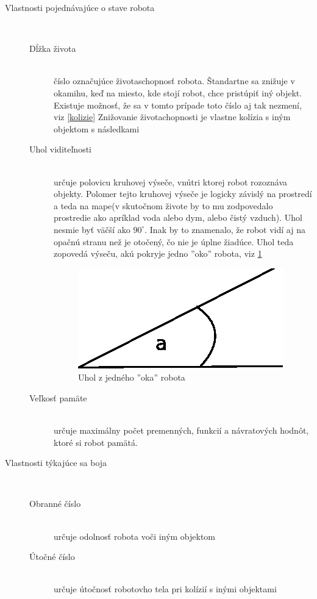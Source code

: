 \begin{description}
\item [Vlastnosti pojednávajúce o stave robota] \hfill \\
\begin{description} 
\item [Dĺžka života] \hfill \\ číslo označujúce životaschopnosť robota. Štandartne sa znižuje v okamihu, keď na miesto, kde stojí robot, chce pristúpiť iný objekt. Existuje možnosť, že sa v tomto prípade toto číslo aj tak nezmení, viz \ref{kolizie} Znižovanie životachopnosti je vlastne kolízia s iným objektom s následkami
\item [Uhol viditeľnosti]\hfill \\ určuje polovicu kruhovej výseče, vnútri ktorej robot rozoznáva objekty. Polomer tejto kruhovej výseče je logicky závislý na prostredí a teda na mape(v skutočnom živote by to mu zodpovedalo prostredie ako apríklad voda alebo dym, alebo čistý vzduch). Uhol nesmie byť väčší ako $90^\circ$. Inak by to znamenalo, že robot vidí aj na opačnú stranu než je otočený, čo nie je úplne žiadúce. Uhol teda zopovedá výseču, akú pokryje jedno ''oko'' robota, viz \ref{uhol}
\begin {figure}
\centering
\includegraphics{angle}
\caption { Uhol z jedného ''oka'' robota }
\label{uhol}
\end {figure}
\item [Veľkosť pamäte]\hfill \\ určuje maximálny počet premenných, funkcií a návratových hodnôt, ktoré si robot pamätá. 
\end{description}
\item [Vlastnosti týkajúce sa boja]\hfill \\
\begin{description}
\item [Obranné číslo]\hfill \\ určuje odolnosť robota voči iným objektom
\item [Útočné číslo]\hfill \\ určuje útočnosť robotovho tela pri kolízií s inými objektami

\end{description}
\end{description}

